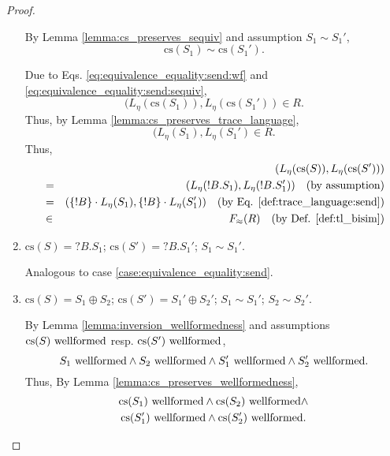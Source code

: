 \documentclass{llncs}
\newcommand*{\bisim}{\approx}
\newcommand*{\cs}{\mathrm{cs}}
\newcommand*{\sequiv}{\sim}
\newcommand*{\send}{\mathord{!}}
\newcommand*{\recv}{\mathord{?}}
\newcommand*{\echoice}{\oplus}
\newcommand*{\concat}{\cdot}
\newcommand*{\wf}[1]{\text{$#1$ {\normalfont \rmfamily wellformed}}}
\renewcommand*{\|}{\;|\;}
\begin{document}
\begin{proof}
\begin{enumerate}
      By Lemma \ref{lemma:cs_preserves_sequiv} and assumption
      $S_1 \sequiv S_1'$,
      \begin{equation}
        \label{eq:equivalence_equality:send:sequiv}
        \cs(S_1) \sequiv \cs(S_1').
      \end{equation}

      Due to Eqs. \ref{eq:equivalence_equality:send:wf} and
      \ref{eq:equivalence_equality:send:sequiv},
      \begin{equation*}
        (L_\eta(\cs(S_1)), L_\eta(\cs(S_1')) \in R.
      \end{equation*}
      Thus, by Lemma \ref{lemma:cs_preserves_trace_language},
      \begin{equation*}
        (L_\eta(S_1), L_\eta(S_1') \in R.
      \end{equation*}
      Thus,
      \begin{eqnarray*}
        &&  (L_\eta(\cs(S)), L_\eta(\cs(S'))) \\
        &=& (L_\eta(\send B.S_1), L_\eta(\send B.S_1'))
        \quad \text{(by assumption)} \\
        &=& (\{\send B\} \concat L_\eta(S_1), \{\send B\} \concat L_\eta(S_1'))
        \quad \text{(by Eq. \ref{def:trace_language:send})} \\
        &\in& F_\bisim(R)
        \quad \text{(by Def. \ref{def:tl_bisim})}
      \end{eqnarray*}

    \item
      \label{case:equivalence_equality:recv}
      $\cs(S) = \recv B.S_1$; $\cs(S') = \recv B.S_1'$; $S_1 \sequiv S_1'$.

      Analogous to case \ref{case:equivalence_equality:send}.

    \item
      \label{case:equivalence_equality:echoice}
      $\cs(S) = S_1 \echoice S_2$; $\cs(S') = S_1' \echoice S_2'$;
      $S_1 \sequiv S_1'$; $S_2 \sequiv S_2'$.

      By Lemma \ref{lemma:inversion_wellformedness} and assumptions
      $\wf{\cs(S)}$ resp. $\wf{\cs(S')}$,
      \begin{equation*}
        \wf{S_1} \land \wf{S_2} \land \wf{S_1'} \land \wf{S_2'}.
      \end{equation*}
      Thus, By Lemma \ref{lemma:cs_preserves_wellformedness},
      \begin{multline}
        \label{eq:equivalence_equality:echoice:wf}
        \wf{\cs(S_1)} \land \wf{\cs(S_2)} \land \\
        \wf{\cs(S_1')} \land \wf{\cs(S_2')}.
      \end{multline}


\end{enumerate}
\end{proof}
\end{document}
